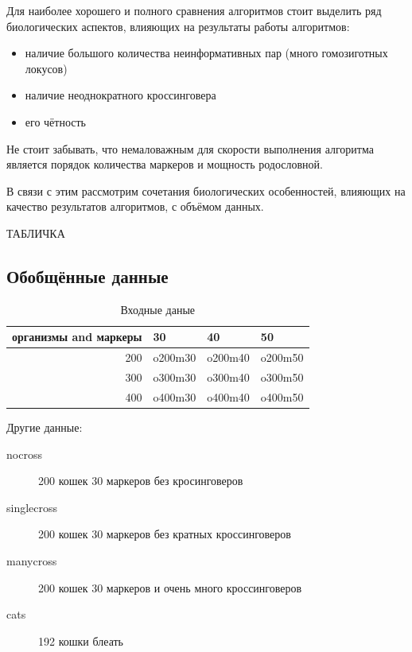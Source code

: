 \documentclass{matmex-diploma-custom}
\begin{document}
Для наиболее хорошего и полного сравнения алгоритмов стоит выделить
ряд биологических аспектов, влияющих на результаты работы алгоритмов:
\begin{itemize}
\item наличие большого количества неинформативных пар (много
  гомозиготных локусов)
\item наличие неоднократного кроссинговера
\item его чётность
\end{itemize}

Не стоит забывать, что немаловажным для скорости выполнения алгоритма
является порядок количества маркеров и мощность родословной.

В связи с этим рассмотрим сочетания биологических особенностей,
влияющих на качество результатов алгоритмов, с объёмом данных.

ТАБЛИЧКА

\subsection{Обобщённые данные}

\begin{table}[h]
  \centering
\begin{tabular}{rlll}
\hline
организмы and маркеры & 30 & 40 & 50 \\
\hline
200 & o200m30 & o200m40 & o200m50 \\
300 & o300m30 & o300m40 & o300m50 \\
400 & o400m30 & o400m40 & o400m50 \\
\hline
\end{tabular}
  \caption{Входные даные}
  \label{tab:data}
\end{table}

Другие данные:
\begin{description}
\item[nocross] 200 кошек 30 маркеров без кросинговеров
\item[singlecross] 200 кошек 30 маркеров без кратных кроссинговеров
\item[manycross] 200 кошек 30 маркеров и очень много кроссинговеров
\item[cats] 192 кошки блеать
\end{description}
\end{document}
